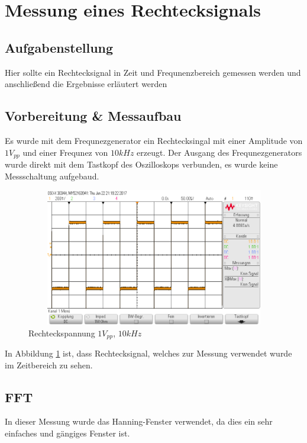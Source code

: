 \section{Messung eines Rechtecksignals}
\subsection{Aufgabenstellung}
Hier sollte ein Rechtecksignal in Zeit und Frequnenzbereich gemessen werden und anschlie\ss{}end die Ergebnisse erl\"autert werden

\subsection{Vorbereitung \& Messaufbau}
Es wurde mit dem Frequnezgenerator ein Rechtecksingal mit einer Amplitude von $1V_{pp}$ und einer Frequnez von $10kHz$ erzeugt. Der Ausgang des Frequnezgenerators wurde direkt mit dem Tastkopf des Oszilloskops verbunden, es wurde keine Messschaltung aufgebaud.

\begin{figure}[H]
 \begin{center}
  \includegraphics[height=6cm,width=12cm]{OsziBilder/bsp2_time.png}
 \end{center}
 \caption{Rechteckspannung $1V_{pp}$, $10kHz$}\label{bsp2_time}
\end{figure}
\noindent
In Abbildung \ref{bsp2_time} ist, dass Rechtecksignal, welches zur Messung verwendet wurde im Zeitbereich zu sehen. \\

\subsection{FFT}
In dieser Messung wurde das Hanning-Fenster verwendet, da dies ein sehr einfaches und g\"angiges Fenster ist.

